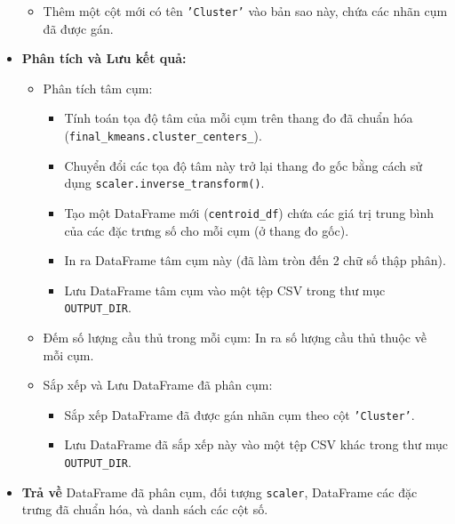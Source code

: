 \documentclass[12pt, a4paper]{report}
\begin{document}
\begin{itemize}
\begin{itemize}
        \item Thêm một cột mới có tên \texttt{'Cluster'} vào bản sao này, chứa các nhãn cụm đã được gán.
    \end{itemize}
    \item \textbf{Phân tích và Lưu kết quả:}
    \begin{itemize}
        \item Phân tích tâm cụm:
        \begin{itemize}
            \item Tính toán tọa độ tâm của mỗi cụm trên thang đo đã chuẩn hóa (\texttt{final\_kmeans.cluster\_centers\_}).
            \item Chuyển đổi các tọa độ tâm này trở lại thang đo gốc bằng cách sử dụng \texttt{scaler.inverse\_transform()}.
            \item Tạo một DataFrame mới (\texttt{centroid\_df}) chứa các giá trị trung bình của các đặc trưng số cho mỗi cụm (ở thang đo gốc).
            \item In ra DataFrame tâm cụm này (đã làm tròn đến 2 chữ số thập phân).
            \item Lưu DataFrame tâm cụm vào một tệp CSV trong thư mục \texttt{OUTPUT\_DIR}.
        \end{itemize}
        \item Đếm số lượng cầu thủ trong mỗi cụm: In ra số lượng cầu thủ thuộc về mỗi cụm.
        \item Sắp xếp và Lưu DataFrame đã phân cụm:
        \begin{itemize}
            \item Sắp xếp DataFrame đã được gán nhãn cụm theo cột \texttt{'Cluster'}.
            \item Lưu DataFrame đã sắp xếp này vào một tệp CSV khác trong thư mục \texttt{OUTPUT\_DIR}.
        \end{itemize}
    \end{itemize}
    \item \textbf{Trả về} DataFrame đã phân cụm, đối tượng \texttt{scaler}, DataFrame các đặc trưng đã chuẩn hóa, và danh sách các cột số.
\end{itemize}
\end{document}
